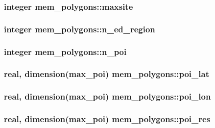 \subsubsection[{\texorpdfstring{maxsite}{maxsite}}]{\setlength{\rightskip}{0pt plus 5cm}integer mem\+\_\+polygons\+::maxsite}\hypertarget{namespacemem__polygons_a6ea7e4cae77c3cdabf5313950a022aa1}{}\label{namespacemem__polygons_a6ea7e4cae77c3cdabf5313950a022aa1}
\subsubsection[{\texorpdfstring{n\+\_\+ed\+\_\+region}{n_ed_region}}]{\setlength{\rightskip}{0pt plus 5cm}integer mem\+\_\+polygons\+::n\+\_\+ed\+\_\+region}\hypertarget{namespacemem__polygons_aff9e65847e5c49e661181c4eaeee87f9}{}\label{namespacemem__polygons_aff9e65847e5c49e661181c4eaeee87f9}
\subsubsection[{\texorpdfstring{n\+\_\+poi}{n_poi}}]{\setlength{\rightskip}{0pt plus 5cm}integer mem\+\_\+polygons\+::n\+\_\+poi}\hypertarget{namespacemem__polygons_a40cfdce95dfd1bde88dfdc7e2aa9c667}{}\label{namespacemem__polygons_a40cfdce95dfd1bde88dfdc7e2aa9c667}
\subsubsection[{\texorpdfstring{poi\+\_\+lat}{poi_lat}}]{\setlength{\rightskip}{0pt plus 5cm}real, dimension(max\+\_\+poi) mem\+\_\+polygons\+::poi\+\_\+lat}\hypertarget{namespacemem__polygons_acf0a86c4cebdaacd2344c2af339605a3}{}\label{namespacemem__polygons_acf0a86c4cebdaacd2344c2af339605a3}
\subsubsection[{\texorpdfstring{poi\+\_\+lon}{poi_lon}}]{\setlength{\rightskip}{0pt plus 5cm}real, dimension(max\+\_\+poi) mem\+\_\+polygons\+::poi\+\_\+lon}\hypertarget{namespacemem__polygons_aa70b00dd2ead0ce3911b4d7bed6e5212}{}\label{namespacemem__polygons_aa70b00dd2ead0ce3911b4d7bed6e5212}
\subsubsection[{\texorpdfstring{poi\+\_\+res}{poi_res}}]{\setlength{\rightskip}{0pt plus 5cm}real, dimension(max\+\_\+poi) mem\+\_\+polygons\+::poi\+\_\+res}\hypertarget{namespacemem__polygons_abc1cd4ebde7513a27a637c90ac77477a}{}\label{namespacemem__polygons_abc1cd4ebde7513a27a637c90ac77477a}
